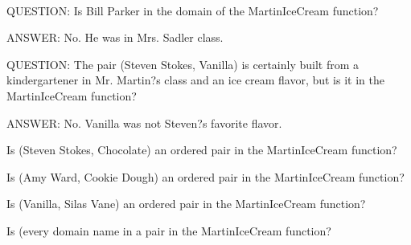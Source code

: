 \documentclass{ximera}
\begin{document}
\quad \\



\begin{dialogue}
\item[QUESTION:] Is Bill Parker in the domain of the MartinIceCream function?
\item[ANSWER:]  No. He was in Mrs. Sadler class.
\item[QUESTION:]  The pair (Steven Stokes, Vanilla) is certainly built from a kindergartener in Mr. Martin?s class and an ice cream flavor, but is it in the MartinIceCream function?
\item[ANSWER:] No. Vanilla was not Steven?s favorite flavor.
\end{dialogue}



\begin{question}
Is (Steven Stokes, Chocolate) an ordered pair in the MartinIceCream function?
\begin{multipleChoice}
\end{multipleChoice}
\end{question}



\begin{question}
Is (Amy Ward, Cookie Dough) an ordered pair in the MartinIceCream function?
\begin{multipleChoice}
\end{multipleChoice}
\end{question}


\begin{question}
Is (Vanilla, Silas Vane) an ordered pair in the MartinIceCream function?
\begin{multipleChoice}
\end{multipleChoice}
\end{question}


\begin{question}
Is (every domain name in a pair in the MartinIceCream function?
\begin{multipleChoice}
\end{multipleChoice}
\end{question}
\end{document}
